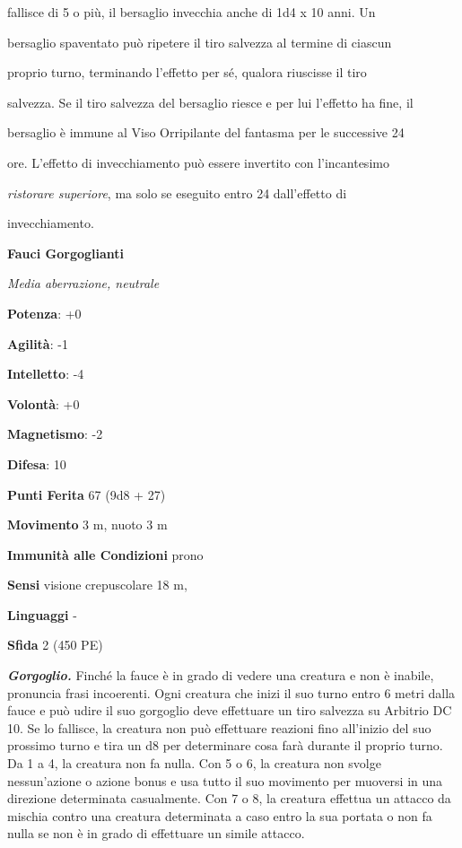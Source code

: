 \begin{multicols}{2}
fallisce di 5 o più, il bersaglio invecchia anche di 1d4 x 10 anni. Un

bersaglio spaventato può ripetere il tiro salvezza al termine di ciascun

proprio turno, terminando l'effetto per sé, qualora riuscisse il tiro

salvezza. Se il tiro salvezza del bersaglio riesce e per lui l'effetto
ha fine, il

bersaglio è immune al Viso Orripilante del fantasma per le successive 24

ore. L'effetto di invecchiamento può essere invertito con l'incantesimo

\emph{ristorare superiore}, ma solo se eseguito entro 24 dall'effetto di

invecchiamento.

\textbf{Fauci Gorgoglianti}

\emph{Media aberrazione, neutrale}

\textbf{Potenza}: +0

\textbf{Agilità}: -1

\textbf{Intelletto}: -4

\textbf{Volontà}: +0

\textbf{Magnetismo}: -2

\textbf{Difesa}: 10

\textbf{Punti Ferita} 67 (9d8 + 27)

\textbf{Movimento} 3 m, nuoto 3 m

\textbf{Immunità alle Condizioni} prono

\textbf{Sensi} visione crepuscolare 18 m, 

\textbf{Linguaggi} -

\textbf{Sfida} 2 (450 PE)

\emph{\textbf{Gorgoglio.}} Finché la fauce è in grado di vedere una
creatura e non è inabile, pronuncia frasi incoerenti. Ogni creatura che
inizi il suo turno entro 6 metri dalla fauce e può udire il suo
gorgoglio deve effettuare un tiro salvezza su Arbitrio DC 10. Se lo
fallisce, la creatura non può effettuare reazioni fino all'inizio del
suo prossimo turno e tira un d8 per determinare cosa farà durante il
proprio turno. Da 1 a 4, la creatura non fa nulla. Con 5 o 6, la
creatura non svolge nessun'azione o azione bonus e usa tutto il suo
movimento per muoversi in una direzione determinata casualmente. Con 7 o
8, la creatura effettua un attacco da mischia contro una creatura
determinata a caso entro la sua portata o non fa nulla se non è in grado
di effettuare un simile attacco.


\end{multicols}
